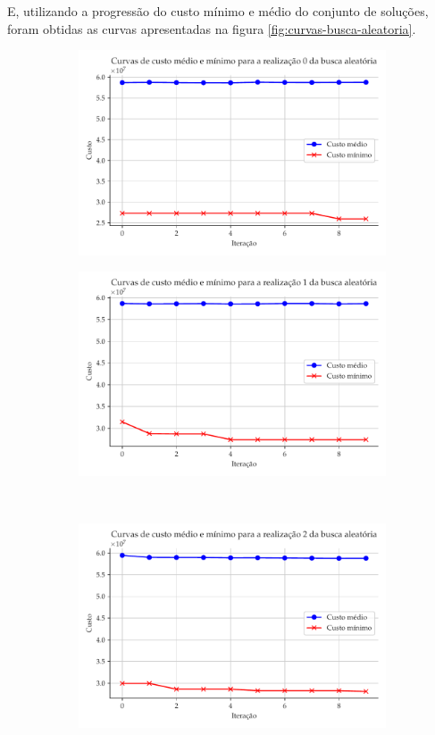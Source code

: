 \documentclass[a4paper, 12pt]{article}
\begin{document}
E, utilizando a progressão do custo mínimo e médio do conjunto de soluções, foram obtidas as curvas apresentadas na figura \ref{fig:curvas-busca-aleatoria}.
\begin{figure}[!ht]
\centering
\begin{subfigure}{0.4\textwidth}
    \includegraphics[width=\textwidth]{figuras/iteracao-0.pdf}
\end{subfigure}
\begin{subfigure}{0.4\textwidth}
    \includegraphics[width=\textwidth]{figuras/iteracao-1.pdf}
\end{subfigure}
\hfill
\\
\centering
\begin{subfigure}{0.4\textwidth}
    \includegraphics[width=\textwidth]{figuras/iteracao-2.pdf}

\end{subfigure}
\end{figure}
\end{document}
